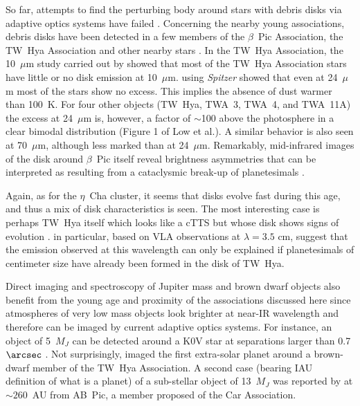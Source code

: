 \documentclass[11pt,twoside]{book}
\begin{document}
So far, attempts to find the perturbing body around stars with debris
disks via adaptive optics systems have failed \citep{mac03,zuck04}.
Concerning the nearby young associations, debris disks have been
detected in a few members of the $\beta$~Pic Association, the TW~Hya
Association and other nearby stars
\citep[][]{zuckerman01a,zuck04,zuckerman04}.  In the TW~Hya
Association, the 10~$\mu$m study carried out by \cite{ray99} showed
that most of the TW~Hya Association stars have little or no disk
emission at 10~$\mu$m.  \cite{low05} using {\em Spitzer} showed that
even at 24~$\mu$m most of the stars show no excess. This implies the
absence of dust warmer than 100~K.  For four other objects (TW~Hya,
TWA~3, TWA~4, and TWA~11A) the excess at 24~$\mu$m is, however, a
factor of $\sim$100 above the photosphere in a clear bimodal
distribution (Figure 1 of Low et al.).  A similar behavior is also
seen at 70~$\mu$m, although less marked than at 24~$\mu$m.
Remarkably, mid-infrared images of the disk around $\beta$~Pic itself
reveal brightness asymmetries that can be interpreted as resulting
from a cataclysmic break-up of planetesimals \citep{telesco05}.

Again, as for the $\eta$~Cha cluster, it seems that disks evolve fast during
this age, and thus a mix of disk characteristics is seen.
The most interesting case is perhaps TW~Hya itself which looks
like a cTTS \citep[e.g.][]{RucinskiKrautter1983, delareza89, gregorio92} but
whose disk shows signs of evolution \citep[]
{krist00,weinberger02,weinberger04,wilner05,low05}.
\cite{wilner05} in particular, based on VLA observations
at $\lambda=3.5$ cm, suggest that the emission observed at this  wavelength can
only be explained if
planetesimals of centimeter size have already been formed in the disk  of TW~Hya.


Direct imaging and spectroscopy of Jupiter mass and brown dwarf  objects also benefit from the young age
and proximity of the associations discussed here since atmospheres of  very low mass objects look
brighter at near-IR wavelength \citep[e.g.][]{burrows97} and  therefore can be imaged by current
adaptive optics systems. For instance, an object of 5~$M_J$ can be  detected around a K0V star at
separations larger than 0.7$\arcsec$ \citep{masciadri05}.
Not surprisingly, \cite{chauvin04,chauvin05a} imaged the first extra-solar planet around a brown-dwarf
member of the TW~Hya Association.
A second case (bearing IAU definition of what is a planet) of a sub-stellar object of 13~$M_J$ was
reported by \cite{chauvin05c} at $\sim260$~AU from AB~Pic, a  member proposed of the  Car Association.
\end{document}
